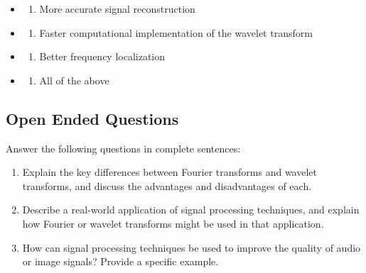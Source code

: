 \documentclass[
  letterpaper,
  DIV=11,
  numbers=noendperiod]{scrartcl}
\providecommand{\tightlist}{%
  \setlength{\itemsep}{0pt}\setlength{\parskip}{0pt}}\usepackage{longtable,booktabs,array}
\begin{document}
\begin{enumerate}
  \begin{itemize}
  \tightlist
  \item
    \begin{enumerate}
    \def\labelenumii{\alph{enumii})}
    \tightlist
    \item
      More accurate signal reconstruction
    \end{enumerate}
  \item
    \begin{enumerate}
    \def\labelenumii{\alph{enumii})}
    \setcounter{enumii}{1}
    \tightlist
    \item
      Faster computational implementation of the wavelet transform
    \end{enumerate}
  \item
    \begin{enumerate}
    \def\labelenumii{\alph{enumii})}
    \setcounter{enumii}{2}
    \tightlist
    \item
      Better frequency localization
    \end{enumerate}
  \item
    \begin{enumerate}
    \def\labelenumii{\alph{enumii})}
    \setcounter{enumii}{3}
    \tightlist
    \item
      All of the above
    \end{enumerate}
  \end{itemize}
\end{enumerate}

\subsection{Open Ended Questions}\label{open-ended-questions}

Answer the following questions in complete sentences:

\begin{enumerate}
\def\labelenumi{\arabic{enumi}.}
\tightlist
\item
  Explain the key differences between Fourier transforms and wavelet
  transforms, and discuss the advantages and disadvantages of each.
\item
  Describe a real-world application of signal processing techniques, and
  explain how Fourier or wavelet transforms might be used in that
  application.
\item
  How can signal processing techniques be used to improve the quality of
  audio or image signals? Provide a specific example.
\end{enumerate}
\end{document}
